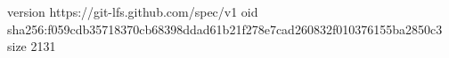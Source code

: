 version https://git-lfs.github.com/spec/v1
oid sha256:f059cdb35718370cb68398ddad61b21f278e7cad260832f010376155ba2850c3
size 2131

